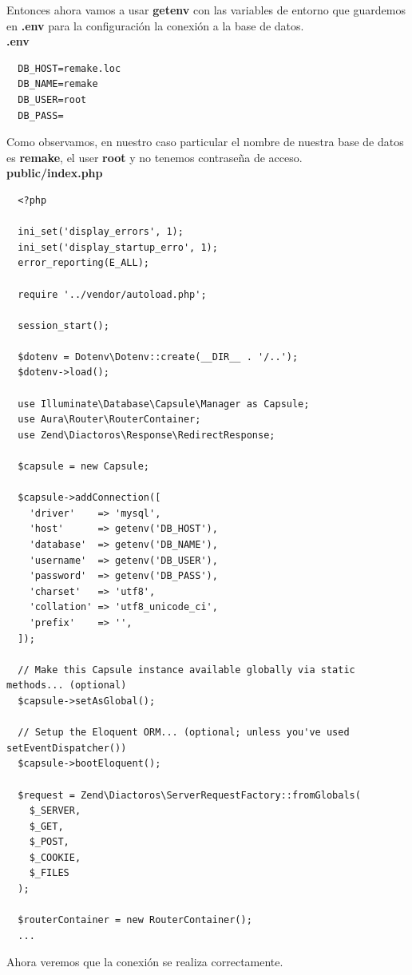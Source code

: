 \documentclass{article}
\begin{document}
Entonces ahora vamos a usar \textbf{getenv} con las variables de entorno que
guardemos en \textbf{.env} para la configuración la conexión a la base de
datos.\\

\textbf{.env}
\begin{verbatim}
  DB_HOST=remake.loc
  DB_NAME=remake
  DB_USER=root
  DB_PASS=
\end{verbatim}

Como observamos, en nuestro caso particular el nombre de nuestra base de datos
es \textbf{remake}, el user \textbf{root} y no tenemos contraseña de acceso.\\

\textbf{public/index.php}
\begin{verbatim}
  <?php

  ini_set('display_errors', 1);
  ini_set('display_startup_erro', 1);
  error_reporting(E_ALL);

  require '../vendor/autoload.php';

  session_start();

  $dotenv = Dotenv\Dotenv::create(__DIR__ . '/..');
  $dotenv->load();

  use Illuminate\Database\Capsule\Manager as Capsule;
  use Aura\Router\RouterContainer;
  use Zend\Diactoros\Response\RedirectResponse;

  $capsule = new Capsule;

  $capsule->addConnection([
    'driver'    => 'mysql',
    'host'      => getenv('DB_HOST'),
    'database'  => getenv('DB_NAME'),
    'username'  => getenv('DB_USER'),
    'password'  => getenv('DB_PASS'),
    'charset'   => 'utf8',
    'collation' => 'utf8_unicode_ci',
    'prefix'    => '',
  ]);

  // Make this Capsule instance available globally via static methods... (optional)
  $capsule->setAsGlobal();

  // Setup the Eloquent ORM... (optional; unless you've used setEventDispatcher())
  $capsule->bootEloquent();

  $request = Zend\Diactoros\ServerRequestFactory::fromGlobals(
    $_SERVER,
    $_GET,
    $_POST,
    $_COOKIE,
    $_FILES
  );

  $routerContainer = new RouterContainer();
  ...
\end{verbatim}

Ahora veremos que la conexión se realiza correctamente.
\end{document}
